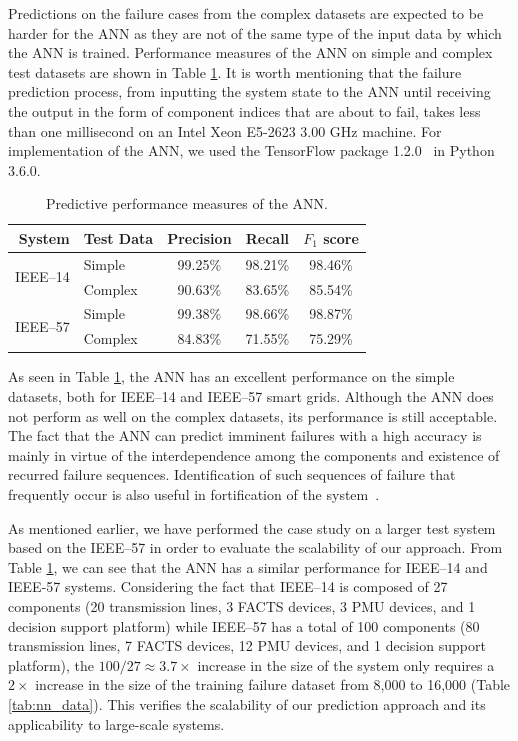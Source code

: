 \documentclass[12pt]{elsarticle}
\begin{document}
Predictions on the failure cases from the complex datasets are expected to be harder for the ANN as they are not of the same type of the input data by which the ANN is trained. Performance measures of the ANN on simple and complex test datasets are shown in Table \ref{tab:nn_perf}. It is worth mentioning that the failure prediction process, from inputting the system state to the ANN until receiving the output in the form of component indices that are about to fail, takes less than one millisecond on an Intel Xeon E5-2623 3.00 GHz machine. For implementation of the ANN, we used the TensorFlow package 1.2.0~\cite{AbA15} in Python 3.6.0.

\begin{table}
\caption{Predictive performance measures of the ANN.}
\label{tab:nn_perf}
\centering
\renewcommand{\arraystretch}{1.1}
\begin{tabular}{rl|ccc}
System                    & Test Data & Precision & Recall  & $F_1$ score \\ \hline %
\multirow{2}{*}{IEEE--14} & Simple    & 99.25\%   & 98.21\% & 98.46\%     \\        %
                          & Complex   & 90.63\%   & 83.65\% & 85.54\%     \\ \hline %
\multirow{2}{*}{IEEE--57} & Simple    & 99.38\%   & 98.66\% & 98.87\%     \\        %
                          & Complex   & 84.83\%   & 71.55\% & 75.29\%               %
\end{tabular}
\end{table}

As seen in Table \ref{tab:nn_perf}, the ANN has an excellent performance on the simple datasets, both for IEEE--14 and IEEE--57 smart grids. Although the ANN does not perform as well on the complex datasets, its performance is still acceptable. The fact that the ANN can predict imminent failures with a high accuracy is mainly in virtue of the interdependence among the components and existence of recurred failure sequences. Identification of such sequences of failure that frequently occur is also useful in fortification of the system~\cite{WoM20}.

As mentioned earlier, we have performed the case study on a larger test system based on the IEEE--57 in order to evaluate the scalability of our approach. From Table \ref{tab:nn_perf}, we can see that the ANN has a similar performance for IEEE--14 and IEEE-57 systems. Considering the fact that IEEE--14 is composed of 27 components (20 transmission lines, 3 FACTS devices, 3 PMU devices, and 1 decision support platform) while IEEE--57 has a total of 100 components (80 transmission lines, 7 FACTS devices, 12 PMU devices, and 1 decision support platform), the $100/27 \approx 3.7 \times$ increase in the size of the system only requires a $2 \times$ increase in the size of the training failure dataset from 8,000 to 16,000 (Table \ref{tab:nn_data}). This verifies the scalability of our prediction approach and its applicability to large-scale systems.
\end{document}
